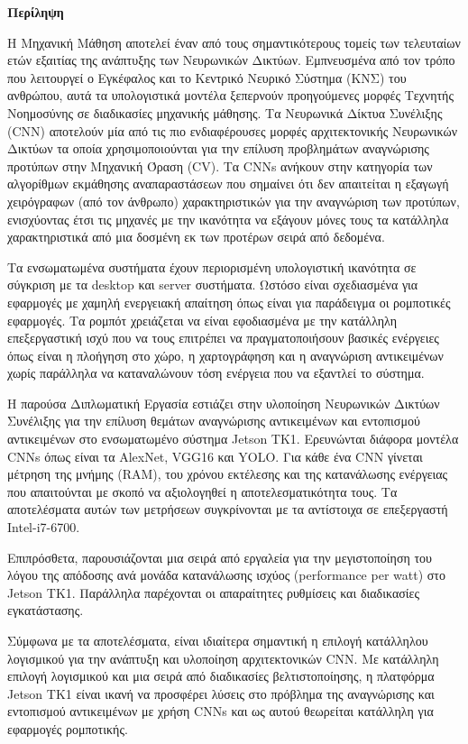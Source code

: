 \begin{center}
  \centering

  \vspace{0.5cm}
  \centering
  \textbf{\Large{Περίληψη}}

  \vspace{1cm}

\end{center}

  Η Μηχανική Μάθηση αποτελεί έναν από τους σημαντικότερους τομείς των τελευταίων
  ετών εξαιτίας της ανάπτυξης των Νευρωνικών Δικτύων.
  Εμπνευσμένα από τον τρόπο που λειτουργεί ο Εγκέφαλος και το Κεντρικό Νευρικό Σύστημα (ΚΝΣ)
  του ανθρώπου, αυτά τα υπολογιστικά μοντέλα ξεπερνούν προηγούμενες μορφές Τεχνητής Νοημοσύνης
  σε διαδικασίες μηχανικής μάθησης.
  Τα Νευρωνικά Δίκτυα Συνέλιξης (CNN) αποτελούν μία από τις πιο ενδιαφέρουσες μορφές αρχιτεκτονικής
  Νευρωνικών Δικτύων τα οποία χρησιμοποιούνται για την επίλυση προβλημάτων αναγνώρισης προτύπων
  στην Μηχανική Όραση (CV). Τα CNNs ανήκουν στην κατηγορία των αλγορίθμων εκμάθησης αναπαραστάσεων που
  σημαίνει ότι δεν απαιτείται η εξαγωγή χειρόγραφων (από τον άνθρωπο) χαρακτηριστικών για την αναγνώριση των
  προτύπων, ενισχύοντας έτσι τις μηχανές με την ικανότητα να εξάγουν μόνες τους
  τα κατάλληλα χαρακτηριστικά από μια δοσμένη εκ των προτέρων σειρά από δεδομένα.

  Τα ενσωματωμένα συστήματα έχουν περιορισμένη υπολογιστική ικανότητα σε σύγκριση με τα desktop και server συστήματα.
  Ωστόσο είναι σχεδιασμένα για εφαρμογές με χαμηλή ενεργειακή απαίτηση όπως
  είναι για παράδειγμα οι ρομποτικές εφαρμογές. Τα ρομπότ χρειάζεται να είναι εφοδιασμένα με την κατάλληλη 
  επεξεργαστική ισχύ που να τους επιτρέπει να πραγματοποιήσουν
  βασικές ενέργειες όπως είναι η πλοήγηση στο χώρο,
  η χαρτογράφηση και η αναγνώριση αντικειμένων χωρίς παράλληλα να καταναλώνουν
  τόση ενέργεια που να εξαντλεί το σύστημα.

  Η παρούσα Διπλωματική Εργασία εστιάζει στην υλοποίηση Νευρωνικών Δικτύων Συνέλιξης για την επίλυση θεμάτων αναγνώρισης
  αντικειμένων και εντοπισμού αντικειμένων στο ενσωματωμένο σύστημα Jetson TK1.
  Ερευνώνται διάφορα μοντέλα CNNs όπως είναι τα AlexNet, VGG16 και YOLO. Για κάθε ένα CNN γίνεται
  μέτρηση της μνήμης (RAM), του χρόνου εκτέλεσης και της κατανάλωσης ενέργειας που απαιτούνται με
  σκοπό να αξιολογηθεί η αποτελεσματικότητα τους. Τα αποτελέσματα αυτών των
  μετρήσεων συγκρίνονται με τα αντίστοιχα σε επεξεργαστή  Intel-i7-6700.

  Επιπρόσθετα, παρουσιάζονται μια σειρά από εργαλεία για την μεγιστοποίηση του λόγου της απόδοσης
  ανά μονάδα κατανάλωσης ισχύος (performance per watt) στο Jetson TK1.
  Παράλληλα παρέχονται οι απαραίτητες ρυθμίσεις και διαδικασίες εγκατάστασης.

  Σύμφωνα με τα αποτελέσματα, είναι ιδιαίτερα σημαντική η επιλογή κατάλληλου λογισμικού για
  την ανάπτυξη και υλοποίηση αρχιτεκτονικών CNN. Με κατάλληλη επιλογή λογισμικού και
  μια σειρά από διαδικασίες βελτιστοποίησης, η πλατφόρμα Jetson TK1 είναι ικανή να προσφέρει λύσεις
  στο πρόβλημα της αναγνώρισης και εντοπισμού αντικειμένων με χρήση CNNs και ως αυτού θεωρείται
  κατάλληλη για εφαρμογές ρομποτικής.

